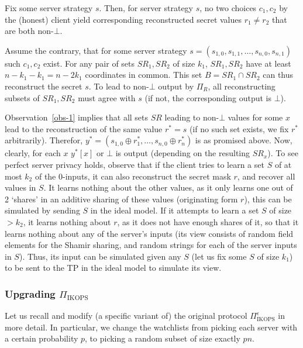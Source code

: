 \documentclass{llncs}
\begin{document}
\begin{observation}\label{obs-1}
Fix some server strategy $s$. Then, for server strategy $s$, no two choices $c_1,c_2$ by the (honest) client yield corresponding reconstructed secret values $r_1\neq r_2$ that are both non-$\bot$. 	
\end{observation}

Assume the contrary, that for some server strategy $s=(s_{1,0},s_{1,1},\ldots,s_{n,0},s_{n,1})$ such $c_1,c_2$ exist.
For any pair of sets $SR_1,SR_2$ of size $k_1$, $SR_1,SR_2$ have at least $n-k_1-k_1=n-2k_1$ coordinates in common. This set $B=SR_1\cap SR_2$ can thus reconstruct the secret $s$. To lead to non-$\bot$ output by $\Pi_R$, all reconstructing subsets of $SR_1,SR_2$ must agree with $s$ (if not, the corresponding output is $\bot$).


Observation~\ref{obs-1} implies that all sets $SR$ leading to non-$\bot$ values for some $x$ lead to the reconstruction of the same value $r^*=s$ (if no such set exists, we fix $r^*$ arbitrarily). Therefor, $y^*=(s_{1,0}\oplus r^*_1,\ldots,s_{n,0}\oplus r^*_n)$ is as promised above. Now, clearly, for each $x$ $y^*[x]$ or $\bot$ is output (depending on the resulting $SR_x$). To see perfect server privacy holds, observe that if the client tries to learn a set $S$ of at most $k_2$ of the 0-inputs, it can also reconstruct the secret mask $r$, and recover all values in $S$.
It learns nothing about the other values, as it only learns one out of 2 `shares' in an additive sharing of these values (originating form $r$), this can be simulated by sending $S$ in the ideal model.
If it attempts to learn a set $S$ of size $>k_2$, it learns nothing about $r$, as it does not have enough shares of it, so that it learns nothing about any of the server's inputs (its view consists of random field elements for the Shamir sharing, and random strings for each of the server inputs in $S$). Thus, its input can be simulated given any $S$
(let us fix some $S$ of size $k_1$) to be sent to the TP in the ideal model to simulate its view.

\subsubsection{Upgrading $\Pi_{\text{IKOPS}}$}

Let us recall and modify (a specific variant of) the original protocol $\Pi^{\epsilon}_{\text{IKOPS}}$ in more detail.
In particular, we change the watchlists from picking each server with
a certain probability $p$, to picking a random subset of size exactly $pn$. 
\end{document}
